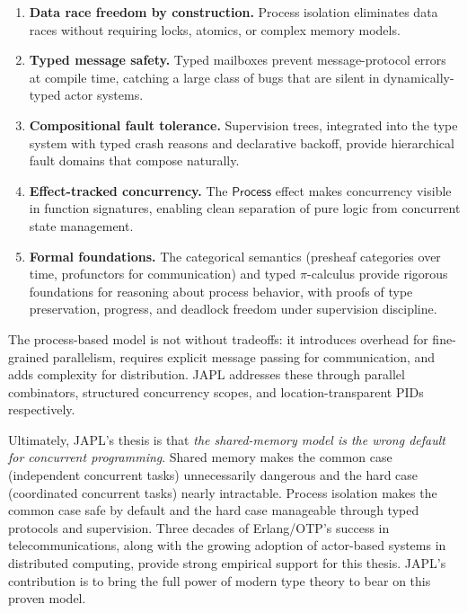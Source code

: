\documentclass[11pt,a4paper]{article}
\begin{document}
\begin{enumerate}
\item \textbf{Data race freedom by construction.} Process isolation eliminates data races without requiring locks, atomics, or complex memory models.

\item \textbf{Typed message safety.} Typed mailboxes prevent message-protocol errors at compile time, catching a large class of bugs that are silent in dynamically-typed actor systems.

\item \textbf{Compositional fault tolerance.} Supervision trees, integrated into the type system with typed crash reasons and declarative backoff, provide hierarchical fault domains that compose naturally.

\item \textbf{Effect-tracked concurrency.} The $\mathsf{Process}$ effect makes concurrency visible in function signatures, enabling clean separation of pure logic from concurrent state management.

\item \textbf{Formal foundations.} The categorical semantics (presheaf categories over time, profunctors for communication) and typed $\pi$-calculus provide rigorous foundations for reasoning about process behavior, with proofs of type preservation, progress, and deadlock freedom under supervision discipline.
\end{enumerate}

The process-based model is not without tradeoffs: it introduces overhead for fine-grained parallelism, requires explicit message passing for communication, and adds complexity for distribution. JAPL addresses these through parallel combinators, structured concurrency scopes, and location-transparent PIDs respectively.

Ultimately, JAPL's thesis is that \emph{the shared-memory model is the wrong default for concurrent programming}. Shared memory makes the common case (independent concurrent tasks) unnecessarily dangerous and the hard case (coordinated concurrent tasks) nearly intractable. Process isolation makes the common case safe by default and the hard case manageable through typed protocols and supervision. Three decades of Erlang/OTP's success in telecommunications, along with the growing adoption of actor-based systems in distributed computing, provide strong empirical support for this thesis. JAPL's contribution is to bring the full power of modern type theory to bear on this proven model.
\end{document}
